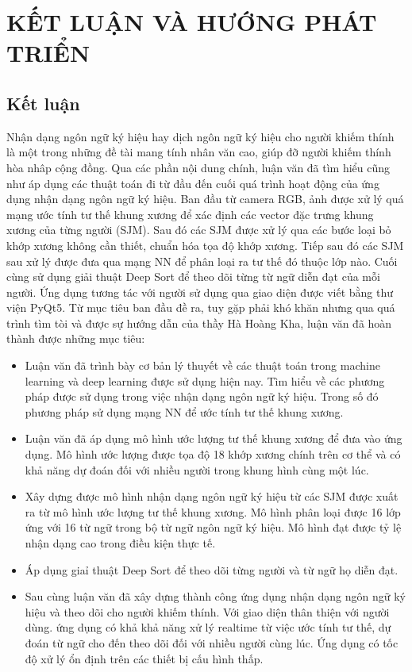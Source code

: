 \chapter{KẾT LUẬN VÀ HƯỚNG PHÁT TRIỂN}

\section{Kết luận}

Nhận dạng ngôn ngữ ký hiệu hay dịch ngôn ngữ ký hiệu cho người khiếm thính là một trong những đề tài mang tính nhân văn cao, giúp đỡ người khiếm thính hòa nhâp cộng đồng. Qua các phần nội dung chính, luận văn đã tìm hiểu cũng như áp dụng các thuật toán đi từ đầu đến cuối quá trình hoạt động của ứng dụng nhận dạng ngôn ngữ ký hiệu. Ban đầu từ camera RGB, ảnh được xử lý quá mạng ước tính tư thế khung xương để xác định các vector đặc trưng khung xương của từng người (SJM). Sau đó các SJM được xử lý qua các bước loại bỏ khớp xương không cần thiết, chuẩn hóa tọa độ khớp xương. Tiếp sau đó các SJM sau xử lý được đưa qua mạng NN để phân loại ra tư thế đó thuộc lớp nào. Cuối cùng sử dụng giải thuật Deep Sort để theo dõi từng từ ngữ diễn đạt của mỗi người. Ứng dụng tương tác với người sử dụng qua giao diện được viết bằng thư viện PyQt5.
\newpage
Từ mục tiêu ban đầu đề ra, tuy gặp phải khó khăn nhưng qua quá trình tìm tòi và được sự hướng dẫn của thầy Hà Hoàng Kha, luận văn đã hoàn thành được những mục tiêu:
\begin{itemize}
\item Luận văn đã trình bày cơ bản lý thuyết về các thuật toán trong machine learning và deep learning được sử dụng hiện nay. Tìm hiểu về các phương pháp được sử dụng trong việc nhận dạng ngôn ngữ ký hiệu. Trong số đó phương pháp sử dụng mạng NN để ước tính tư thế khung xương.
\item Luận văn đã áp dụng mô hình ước lượng tư thế khung xương để đưa vào ứng dụng. Mô hình ước lượng được tọa độ 18 khớp xương chính trên cơ thể và có khả năng dự đoán đối với nhiều người trong khung hình cùng một lúc.

\item Xây dựng được mô hình nhận dạng ngôn ngữ ký hiệu từ các SJM được xuất ra từ mô hình ước lượng tư thế khung xương. Mô hình phân loại được 16 lớp ứng với 16 từ ngữ trong bộ từ ngữ ngôn ngữ ký hiệu. Mô hình đạt được tỷ lệ nhận dạng cao trong điều kiện thực tế.

\item Áp dụng giaỉ thuật Deep Sort để theo dõi từng người và từ ngữ họ diễn đạt.

\item Sau cùng luận văn đã xây dựng thành công ứng dụng nhận dạng ngôn ngữ ký hiệu và theo dõi cho người khiếm thính. Với giao diện thân thiện với người dùng. ứng dụng có khả khả năng xử lý realtime từ việc ước tính tư thế, dự đoán từ ngữ cho đến theo dõi đối với nhiều người cùng lúc. Ứng dụng có tốc độ xử lý ổn định trên các thiết bị cấu hình thấp.
\end{itemize}

